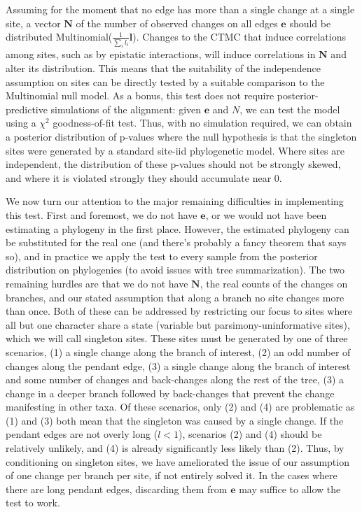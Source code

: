 \documentclass[11pt]{article}
\begin{document}
Assuming for the moment that no edge has more than a single change at a single site, a vector $\boldsymbol{N}$ of the number of observed changes on all edges $\boldsymbol{e}$ should be distributed Multinomial($\frac{1}{\sum_i l_i} \boldsymbol{l}$).
Changes to the CTMC that induce correlations among sites, such as by epistatic interactions, will induce correlations in $\boldsymbol{N}$ and alter its distribution.
This means that the suitability of the independence assumption on sites can be directly tested by a suitable comparison to the Multinomial null model.
As a bonus, this test does not require posterior-predictive simulations of the alignment: given $\boldsymbol{e}$ and $N$, we can test the model using a $\chi^2$ goodness-of-fit test.
Thus, with no simulation required, we can obtain a posterior distribution of p-values where the null hypothesis is that the singleton sites were generated by a standard site-iid phylogenetic model.
Where sites are independent, the distribution of these p-values should not be strongly skewed, and where it is violated strongly they should accumulate near 0.

We now turn our attention to the major remaining difficulties in implementing this test.
First and foremost, we do not have $\boldsymbol{e}$, or we would not have been estimating a phylogeny in the first place.
However, the estimated phylogeny can be substituted for the real one (and there's probably a fancy theorem that says so), and in practice we apply the test to every sample from the posterior distribution on phylogenies (to avoid issues with tree summarization).
The two remaining hurdles are that we do not have $\boldsymbol{N}$, the real counts of the changes on branches, and our stated assumption that along a branch no site changes more than once.
Both of these can be addressed by restricting our focus to sites where all but one character share a state (variable but parsimony-uninformative sites), which we will call singleton sites.
These sites must be generated by one of three scenarios, (1) a single change along the branch of interest, (2) an odd number of changes along the pendant edge, (3) a single change along the branch of interest and some number of changes and back-changes along the rest of the tree, (3) a change in a deeper branch followed by back-changes that prevent the change manifesting in other taxa.
Of these scenarios, only (2) and (4) are problematic as (1) and (3) both mean that the singleton was caused by a single change.
If the pendant edges are not overly long ($l < 1$), scenarios (2) and (4) should be relatively unlikely, and (4) is already significantly less likely than (2).
Thus, by conditioning on singleton sites, we have ameliorated the issue of our assumption of one change per branch per site, if not entirely solved it.
In the cases where there are long pendant edges, discarding them from $\boldsymbol{e}$ may suffice to allow the test to work.
\end{document}
